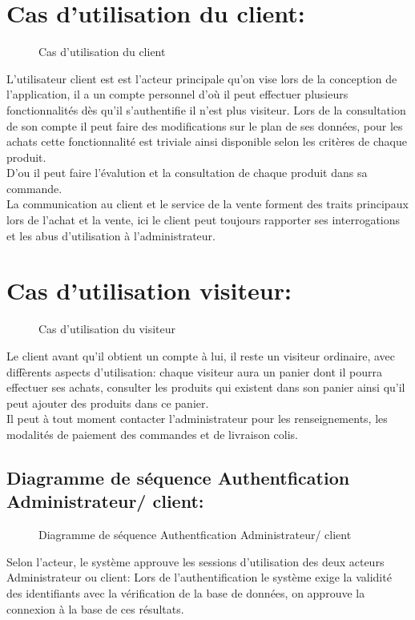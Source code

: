 \documentclass[a4paper]{report}
\begin{document}
\begin{doublespace}
	\section{Cas d'utilisation du client:}
	\begin{figure}[H]
		\begin{center}
			\caption{Cas d'utilisation du client}
		\end{center}
	\end{figure}

	L'utilisateur client est est l'acteur principale qu'on vise
	lors de la conception de l'application, il a un compte personnel d'où il peut
	effectuer plusieurs fonctionnalités dès qu'il s'authentifie il n'est plus
	visiteur. Lors de la consultation de son compte il peut faire des modifications
	sur le plan de ses données, pour les achats cette fonctionnalité est triviale
	ainsi disponible selon les critères de chaque produit.\\D'ou il peut faire
	l'évalution et la consultation de chaque produit dans sa commande. \\ La
	communication au client et le service de la vente forment des traits principaux
	lors de l'achat et la vente, ici le client peut toujours rapporter ses
	interrogations et les abus d'utilisation à l'administrateur.
	\newpage
	\section{Cas d'utilisation visiteur:}
	\begin{figure}[H]
		\begin{center}
			\caption{Cas d'utilisation du visiteur}
		\end{center}
	\end{figure}

	Le client avant qu'il obtient un compte à lui, il reste un
	visiteur ordinaire, avec diffèrents aspects d'utilisation: chaque visiteur aura
	un panier dont il pourra effectuer ses achats, consulter les produits qui
	existent dans son panier ainsi qu'il peut ajouter des produits dans ce
	panier.\\
	Il peut à tout moment contacter l'administrateur pour les
	renseignements, les modalités de paiement des commandes et de livraison colis.

	\subsection{Diagramme de séquence Authentfication
		Administrateur/ client:}
	\begin{figure}[H]
		\begin{center}
			\caption{Diagramme de séquence Authentfication
				Administrateur/ client}
		\end{center}
	\end{figure}
	Selon l'acteur, le système approuve les sessions
	d'utilisation des deux acteurs Administrateur ou client: Lors de
	l'authentification le système exige la validité des identifiants avec la
	vérification de la base de données, on approuve la connexion à la base de ces
	résultats.

\end{doublespace}
\end{document}
